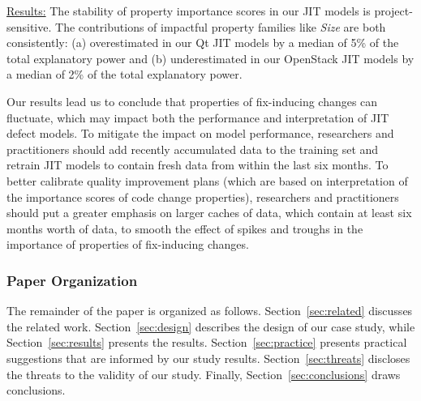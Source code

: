 \begin{enumerate}[{\bf (RQ1)}]
  \underline{Results:}
The stability of property importance scores in our JIT models is project-sensitive.
The contributions of impactful property families like {\em Size} are both consistently:
(a) overestimated in our {\sc Qt} JIT models by a median of 5\% of the total explanatory power 
and (b) underestimated in our {\sc OpenStack} JIT models by a median of 2\% of the total explanatory power.
\end{enumerate}

Our results lead us to conclude that properties of fix-inducing changes can fluctuate, which may impact both the performance and interpretation of JIT defect models.
To mitigate the impact on model performance, researchers and practitioners should add recently accumulated data to the training set and retrain JIT models to contain fresh data from within the last six months.
To better calibrate quality improvement plans (which are based on interpretation of the importance scores of code change properties), researchers and practitioners should put a greater emphasis on larger caches of data, which contain at least six months worth of data, to smooth the effect of spikes and troughs in the importance of properties of fix-inducing changes.

\subsubsection*{Paper Organization}
The remainder of the paper is organized as follows.
Section~\ref{sec:related} discusses the related work.
Section~\ref{sec:design} describes the design of our case study, while Section~\ref{sec:results} presents the results.
Section~\ref{sec:practice} presents practical suggestions that are informed by our study results.
Section~\ref{sec:threats} discloses the threats to the validity of our study.
Finally, Section~\ref{sec:conclusions} draws conclusions.
